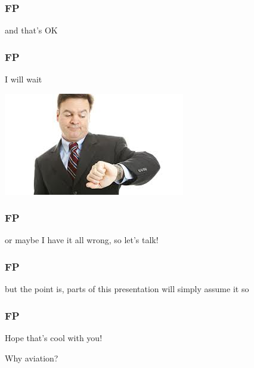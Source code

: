 \begin{frame}
\frametitle{FP}
\begin{center}
and that's OK
\end{center}
\end{frame}

\begin{frame}
\frametitle{FP}
\begin{center}
I will wait

\includegraphics[height=0.1\textheight]{image/man-looking-at-watch.jpg}
\end{center}
\end{frame}

\begin{frame}
\frametitle{FP}
\begin{center}
or maybe I have it all wrong, so let's talk!
\end{center}
\end{frame}

\begin{frame}
\frametitle{FP}
\begin{center}
but the point is, parts of this presentation will simply assume it so
\end{center}
\end{frame}

\begin{frame}
\frametitle{FP}
\begin{center}
Hope that's cool with you!
\end{center}
\end{frame}

\begin{frame}
\begin{center}
Why aviation?
\end{center}
\end{frame}


